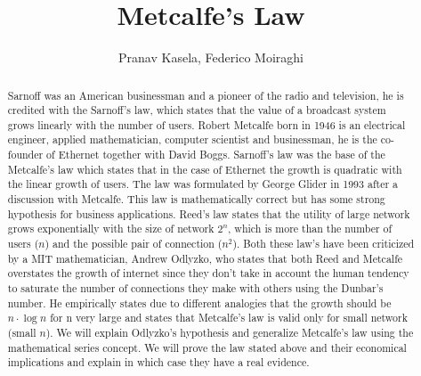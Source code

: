\documentclass[12pt, a4page]{article}
\title{Metcalfe's Law}
\date{}
\author{Pranav Kasela, Federico Moiraghi}
\begin{document}
\maketitle
\begin{abstract}
Sarnoff was an American businessman and a pioneer of the radio and television, he is credited with the Sarnoff’s law, which states that the value of a broadcast system grows linearly with the number of users.
Robert Metcalfe born in 1946 is an electrical engineer, applied mathematician, computer scientist and businessman, he is the co-founder of Ethernet together with David Boggs.\newline
Sarnoff’s law was the base of the Metcalfe’s law which states that in the case of Ethernet the growth is quadratic with the linear growth of users. The law was formulated by George Glider in 1993 after a discussion with Metcalfe. This law is mathematically correct but has some strong hypothesis for business applications. \newline
Reed’s law states that the utility of large network grows exponentially with the size of network $2^n$, which is more than the number of users ($n$) and the possible pair of connection ($n^2$).
Both these law’s have been criticized by a MIT mathematician, Andrew Odlyzko, who states that both Reed and Metcalfe overstates the growth of internet since they don’t take in account the human tendency to saturate the number of connections they make with others using the Dunbar’s number. He empirically states due to different analogies that the growth should be $n\cdot \log n$ for n very large and states that Metcalfe’s law is valid only for small network (small $n$). We will explain Odlyzko’s hypothesis and generalize Metcalfe’s law using the mathematical series concept.\newline
We will prove the law stated above and their economical implications and explain in which case they have a real evidence.
\newpage
\end{abstract}
\end{document}

